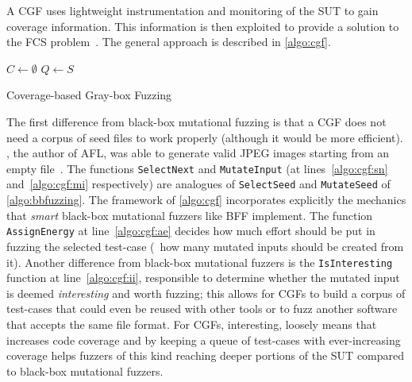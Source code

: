 A \ac{CGF} uses lightweight instrumentation and monitoring of the \ac{SUT} to
gain coverage information. This information is then exploited to provide a
solution to the \ac{FCS}
problem~\cite{afltech,lemieux2017fairfuzz,bohme2017directed,bohme2017coverage}.
The general approach is described in \autoref{algo:cgf}.

\begin{algorithm}
    \DontPrintSemicolon%
    \BlankLine%
    $C \leftarrow \emptyset$\;
    $Q \leftarrow S$\;
    \caption{Coverage-based Gray-box Fuzzing}
\label{algo:cgf}
\end{algorithm}

The first difference from black-box mutational fuzzing is that a \ac{CGF} does
not need a corpus of seed files to work properly (although it would be more
efficient). \citeauthor{afl}, the author of AFL, was able to generate valid JPEG
images starting from an empty file~\cite{afljpeg}. The functions
\texttt{SelectNext} and \texttt{MutateInput} (at lines~\ref{algo:cgf:sn}
and~\ref{algo:cgf:mi} respectively) are analogues of \texttt{SelectSeed} and
\texttt{MutateSeed} of \autoref{algo:bbfuzzing}. The framework of
\autoref{algo:cgf} incorporates explicitly the mechanics that \emph{smart}
black-box mutational fuzzers like \ac{BFF} implement. The function
\texttt{AssignEnergy} at line~\ref{algo:cgf:ae} decides how much effort should
be put in fuzzing the selected test-case (\eg~how many mutated inputs should be
created from it). Another difference from black-box mutational fuzzers is the
\texttt{IsInteresting} function at line~\ref{algo:cgf:ii}, responsible to
determine whether the mutated input is deemed \emph{interesting} and worth
fuzzing; this allows for \acp{CGF} to build a corpus of test-cases that could
even be reused with other tools or to fuzz another software that accepts the
same file format. For \acp{CGF}, interesting, loosely means that increases code
coverage and by keeping a queue of test-cases with ever-increasing coverage
helps fuzzers of this kind reaching deeper portions of the \ac{SUT} compared to
black-box mutational fuzzers.

